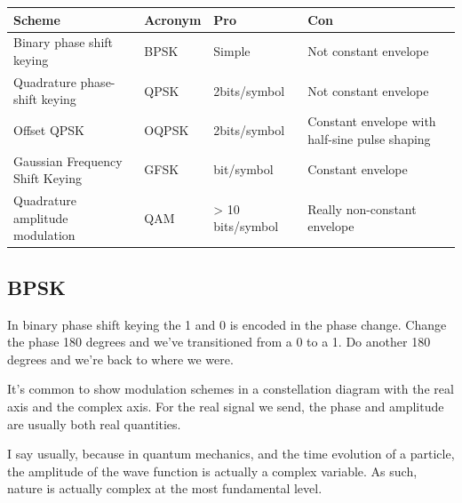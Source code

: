 \begin{longtable}[]{@{}
  >{\raggedright\arraybackslash}p{}
  >{\raggedright\arraybackslash}p{}
  >{\raggedright\arraybackslash}p{}
  >{\raggedright\arraybackslash}p{}@{}}
\toprule\noalign{}
\begin{minipage}[b]{\linewidth}\raggedright
Scheme
\end{minipage} & \begin{minipage}[b]{\linewidth}\raggedright
Acronym
\end{minipage} & \begin{minipage}[b]{\linewidth}\raggedright
Pro
\end{minipage} & \begin{minipage}[b]{\linewidth}\raggedright
Con
\end{minipage} \\
\midrule\noalign{}
\endhead
\bottomrule\noalign{}
\endlastfoot
Binary phase shift keying & BPSK & Simple & Not constant envelope \\
Quadrature phase-shift keying & QPSK & 2bits/symbol & Not constant
envelope \\
Offset QPSK & OQPSK & 2bits/symbol & Constant envelope with half-sine
pulse shaping \\
Gaussian Frequency Shift Keying & GFSK & 1 bit/symbol & Constant
envelope \\
Quadrature amplitude modulation & QAM & \textgreater{} 10 bits/symbol &
Really non-constant envelope \\
\end{longtable}

\subsection{BPSK}\label{bpsk}

In binary phase shift keying the 1 and 0 is encoded in the phase change.
Change the phase 180 degrees and we've transitioned from a 0 to a 1. Do
another 180 degrees and we're back to where we were.

It's common to show modulation schemes in a constellation diagram with
the real axis and the complex axis. For the real signal we send, the
phase and amplitude are usually both real quantities.

I say usually, because in quantum mechanics, and the time evolution of a
particle, the amplitude of the wave function is actually a complex
variable. As such, nature is actually complex at the most fundamental
level.

